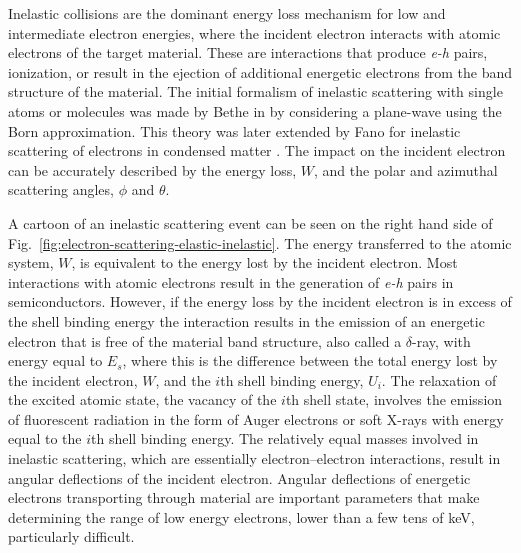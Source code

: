 Inelastic collisions are the dominant energy loss mechanism for low and intermediate electron energies, where the incident electron interacts with atomic electrons of the target material.
These are interactions that produce \emph{e-h} pairs, ionization, or result in the ejection of additional energetic electrons from the band structure of the material.
The initial formalism of inelastic scattering with single atoms or molecules was made by Bethe in \cite{bethe1930theorie,bethe1932bremsformel} by considering a plane-wave using the Born approximation.
This theory was later extended by Fano for inelastic scattering of electrons in condensed matter \cite{fano1964penetration}.
The impact on the incident electron can be accurately described by the energy loss, $W$, and the polar and azimuthal scattering angles, $\phi$ and $\theta$.

A cartoon of an inelastic scattering event can be seen on the right hand side of Fig.~\ref{fig:electron-scattering-elastic-inelastic}. 
The energy transferred to the atomic system, $W$, is equivalent to the energy lost by the incident electron.
Most interactions with atomic electrons result in the generation of \emph{e-h} pairs in semiconductors.
However, if the energy loss by the incident electron is in excess of the shell binding energy the interaction results in the emission of an energetic electron that is free of the material band structure, also called a $\delta$-ray, with energy equal to $E_s$, where this is the difference between the total energy lost by the incident electron, $W$, and the $i$th shell binding energy, $U_i$.
The relaxation of the excited atomic state, the vacancy of the $i$th shell state, involves the emission of fluorescent radiation in the form of Auger electrons or soft X-rays with energy equal to the $i$th shell binding energy.
The relatively equal masses involved in inelastic scattering, which are essentially electron--electron interactions, result in angular deflections of the incident electron.
Angular deflections of energetic electrons transporting through material are important parameters that make determining the range of low energy electrons, lower than a few tens of keV, particularly difficult.

